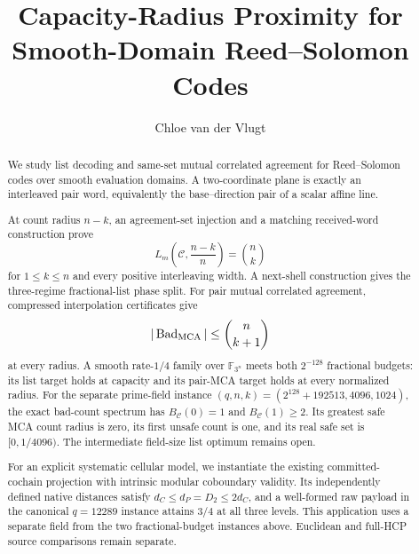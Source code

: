 \documentclass[11pt]{article}
\title{Capacity-Radius Proximity for Smooth-Domain Reed--Solomon Codes}
\author{Chloe van der Vlugt}
\date{}
\begin{document}
\maketitle

\begin{abstract}
We study list decoding and same-set mutual correlated agreement for
Reed--Solomon codes over smooth evaluation domains. A two-coordinate plane
is exactly an interleaved pair word, equivalently the base--direction pair
of a scalar affine line.

At count radius \(n-k\), an agreement-set injection and a matching
received-word construction prove
\[
  L_m\!\left(\mathcal C,\frac{n-k}{n}\right)=\binom nk
\]
for \(1\le k\le n\) and every positive interleaving width. A next-shell
construction gives the three-regime fractional-list phase split. For pair
mutual correlated agreement, compressed interpolation certificates give
\[
  |\operatorname{Bad}_{\operatorname{MCA}}|\le\binom n{k+1}
\]
at every radius. A smooth rate-\(1/4\) family over \(\mathbb F_{3^n}\)
meets both \(2^{-128}\) fractional budgets: its list target holds at capacity
and its pair-MCA target holds at every normalized radius.
For the separate prime-field instance
\((q,n,k)=(2^{128}+192513,4096,1024)\), the exact bad-count spectrum has
\(B_{\mathcal C}(0)=1\) and \(B_{\mathcal C}(1)\ge2\). Its greatest safe MCA
count radius is zero, its first unsafe count is one, and its real safe set
is \([0,1/4096)\). The intermediate field-size list optimum remains open.

For an explicit systematic cellular model, we instantiate the existing
committed-cochain projection with intrinsic modular coboundary validity.
Its independently defined native distances satisfy
\(d_C\le d_P=D_2\le2d_C\), and a well-formed raw payload in the canonical
\(q=12289\) instance attains \(3/4\) at all three levels. This application
uses a separate field from the two fractional-budget instances above.
Euclidean and full-HCP source comparisons remain separate.
\end{abstract}

\tableofcontents












\end{document}
